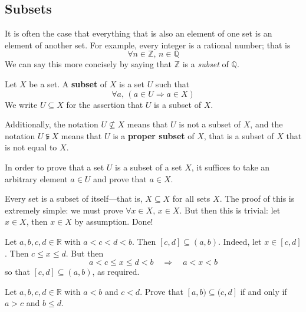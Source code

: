\subsection*{Subsets}

It is often the case that everything that is also an element of one set is an element of another set. For example, every integer is a rational number; that is
\[ \forall n \in \mathbb{Z},\, n \in \mathbb{Q} \]
We can say this more concisely by saying that $\mathbb{Z}$ is a \textit{subset} of $\mathbb{Q}$.

\begin{definition}
\label{defSubset}
Let $X$ be a set. A \textbf{subset} of $X$ is a set $U$ such that
\[ \forall a,\, (a \in U \Rightarrow a \in X) \]
We write $U \subseteq X$  for the assertion that $U$ is a subset of $X$.

Additionally, the notation $U \nsubseteq X$  means that $U$ is not a subset of $X$, and the notation $U \subsetneqq X$  means that $U$ is a \textbf{proper subset} of $X$, that is a subset of $X$ that is not equal to $X$.
\end{definition}

\begin{strategy}
In order to prove that a set $U$ is a subset of a set $X$, it suffices to take an arbitrary element $a \in U$ and prove that $a \in X$.
\end{strategy}

\begin{example}
Every set is a subset of itself---that is, $X \subseteq X$ for all sets $X$. The proof of this is extremely simple: we must prove $\forall x \in X,\, x \in X$. But then this is trivial: let $x \in X$, then $x \in X$ by assumption. Done!
\end{example}

\begin{example}
Let $a,b,c,d \in \mathbb{R}$ with $a<c<d<b$. Then $[c,d] \subseteq (a,b)$. Indeed, let $x \in [c,d]$. Then $c \le x \le d$. But then
\[ a < c \le x \le d < b \quad \Rightarrow \quad a < x < b \]
so that $[c,d] \subseteq (a,b)$, as required.
\end{example}

\begin{exercise}
Let $a,b,c,d \in \mathbb{R}$ with $a<b$ and $c<d$. Prove that $[a,b) \subseteq (c,d]$ if and only if $a > c$ and $b \le d$.
\end{exercise}

